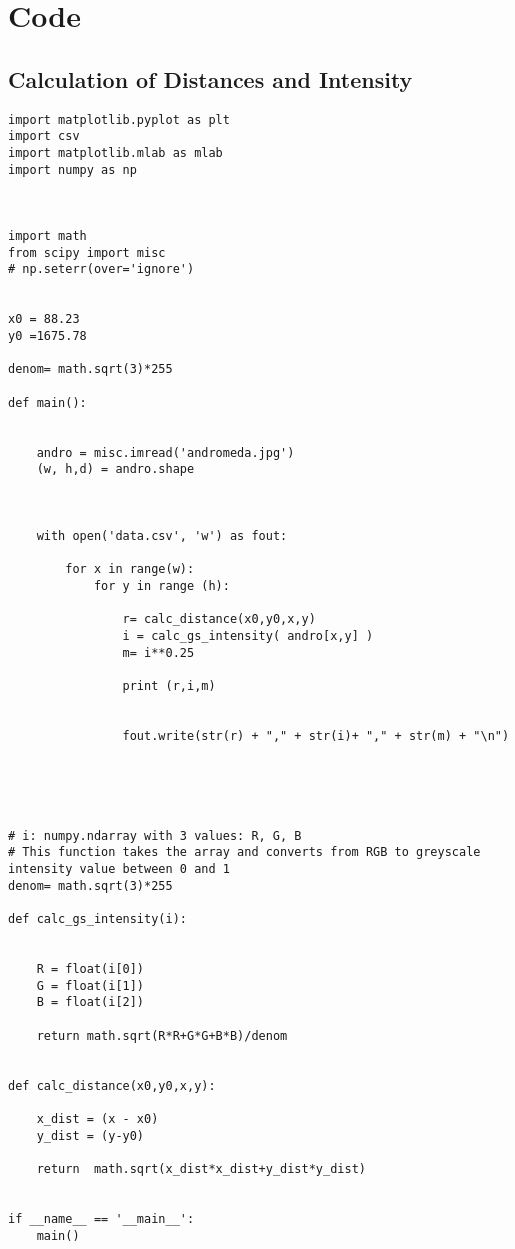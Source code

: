 \chapter{Code}
\section{Calculation of Distances and Intensity}
\begin{verbatim}
import matplotlib.pyplot as plt
import csv
import matplotlib.mlab as mlab
import numpy as np



import math
from scipy import misc
# np.seterr(over='ignore')


x0 = 88.23
y0 =1675.78

denom= math.sqrt(3)*255

def main():


    andro = misc.imread('andromeda.jpg')
    (w, h,d) = andro.shape



    with open('data.csv', 'w') as fout:

        for x in range(w):
            for y in range (h):

                r= calc_distance(x0,y0,x,y)
                i = calc_gs_intensity( andro[x,y] )
                m= i**0.25

                print (r,i,m)


                fout.write(str(r) + "," + str(i)+ "," + str(m) + "\n")





# i: numpy.ndarray with 3 values: R, G, B
# This function takes the array and converts from RGB to greyscale intensity value between 0 and 1
denom= math.sqrt(3)*255

def calc_gs_intensity(i):


    R = float(i[0])
    G = float(i[1])
    B = float(i[2])

    return math.sqrt(R*R+G*G+B*B)/denom


def calc_distance(x0,y0,x,y):

    x_dist = (x - x0)
    y_dist = (y-y0)

    return  math.sqrt(x_dist*x_dist+y_dist*y_dist)


if __name__ == '__main__':
    main()
\end{verbatim}


